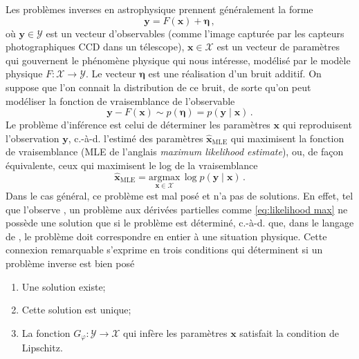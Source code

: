 Les problèmes inverses en astrophysique prennent généralement la forme
\begin{equation}\label{eq:inverse problem lineaire}
       \mathbf{y} = F(\mathbf{x}) + \boldsymbol{\eta}\, ,
\end{equation} 
où $\mathbf{y}\in \mathcal{Y}$ est un vecteur d'observables (comme l'image capturée par les capteurs photographiques CCD dans un télescope), 
$\mathbf{x}\in\mathcal{X}$ est un vecteur de paramètres qui gouvernent le phénomène physique qui nous intéresse, 
modélisé par le modèle physique $F:\mathcal{X} \rightarrow \mathcal{Y}$.
Le vecteur $\boldsymbol{\eta}$ est une réalisation d'un bruit additif. 
On suppose que l’on connait la distribution de ce bruit, de sorte qu'on peut modéliser la fonction de vraisemblance de l'observable
\begin{equation}\label{eq:likelihood intro}
        \mathbf{y} - F(\mathbf{x}) \sim p(\boldsymbol{ \eta}) = p(\mathbf{y} \mid \mathbf{x})\, .
\end{equation} 
Le problème d'inférence est celui de déterminer les paramètres $\mathbf{x}$ qui reproduisent l'observation $\mathbf{y}$, 
c.-à-d. l'estimé des paramètres $\hat{\mathbf{x}}_{\mathrm{MLE}}$ 
qui maximisent la fonction de vraisemblance (MLE de l'anglais \textit{maximum likelihood estimate}), 
ou, de façon équivalente, ceux qui maximisent le log de la vraisemblance
\begin{equation}\label{eq:likelihood max}
        \hat{\mathbf{x}}_{\mathrm{MLE}} = \underset{\mathbf{x} \in \mathcal{X}}{\mathrm{argmax}}\, \log p(\mathbf{y} \mid \mathbf{x})\, .
\end{equation} 
Dans le cas général, ce problème est mal posé et n'a pas de solutions. En effet, 
tel que l'observe \citet{Hadamard1902}, un problème aux dérivées partielles comme \eqref{eq:likelihood max} 
ne possède une solution que si le problème est déterminé, c.-à-d. que, dans le langage de \citet{Hadamard1902}, 
le problème doit correspondre en entier à une situation physique. Cette connexion remarquable s'exprime en trois conditions qui déterminent 
si un problème inverse est bien posé
\begin{enumerate}[label=(\subscript{H}{{\arabic*}})]
        \item \label{hadamard:1}Une solution existe;
        \item \label{hadamard:2}Cette solution est unique;
        \item \label{hadamard:3} La fonction $G_\varphi: \mathcal{Y} \rightarrow \mathcal{X}$ 
                qui infère les paramètres $\mathbf{x}$ satisfait la condition de Lipschitz.
\end{enumerate}
